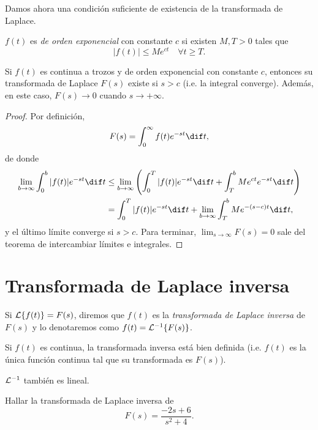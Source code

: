 \documentclass[../ecuaciones_diferenciales.tex]{subfiles}
\begin{document}
Damos ahora una condición suficiente de existencia de la transformada de Laplace.

\begin{definition}
	\(f(t)\) es \emph{de orden exponencial} con constante \(c\) si existen \(M, T
	> 0\) tales que
	\[|f(t)| \leq Me^{ct} \quad \forall t \geq T.\]
\end{definition}

\begin{theorem}
	Si \(f(t)\) es continua a trozos y de orden exponencial con constante \(c\),
	entonces su transformada de Laplace \(F(s)\) existe si \(s > c\) (i.e. la
	integral converge). Además, en este caso, \(F(s) \to 0\) cuando \(s \to +\infty\).
	\begin{proof}
		Por definición,
		\[F(s) = \int_0^\infty f(t)e^{-st} \dif t,\]
		de donde
		\begin{align*}
			\lim_{b \to \infty} \int_0^b |f(t)|e^{-st} \dif t
			 & \leq \lim_{b \to \infty} \left( \int_0^T |f(t)|e^{-st} \dif t
			+ \int_T^b Me^{ct}e^{-st} \dif t \right)                         \\
			 & = \int_0^T |f(t)|e^{-st} \dif t + \lim_{b \to \infty}
			\int_T^b Me^{-(s-c)t} \dif t,
		\end{align*}
		y el último límite converge si \(s>c\). Para terminar,
		\(\lim_{s \to \infty} F(s) = 0\) sale del teorema de intercambiar
		límites e integrales.
	\end{proof}
\end{theorem}

\section{Transformada de Laplace inversa}
Si \(\mathcal{L}\{f(t)\} = F(s)\), diremos que \(f(t)\) es la \emph{transformada de
	Laplace inversa} de \(F(s)\) y lo denotaremos como \(f(t) = \mathcal{L}^{-1}\{F(s)\}\).

\begin{remark}
	Si \(f(t)\) es continua, la transformada inversa está bien definida
	(i.e. \(f(t)\) es la única función continua tal que su transformada es \(F(s)\)).
\end{remark}

\begin{remark}
	\(\mathcal{L}^{-1}\) también es lineal.
\end{remark}

\begin{example}
	Hallar la transformada de Laplace inversa de
	\[F(s) = \frac{-2s+6}{s^2+4}.\]
\end{example}
\end{document}
